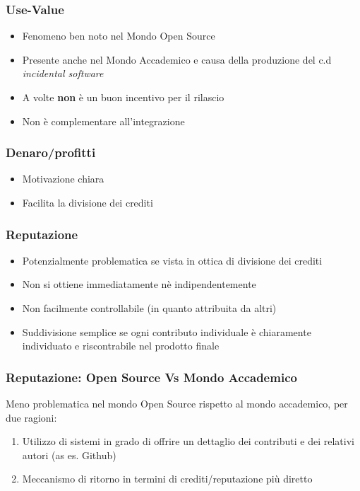\begin{frame}\frametitle{Use-Value}

\Large

\begin{itemize}[<+->]
\itemsep1pt\parskip0pt
\item
  Fenomeno ben noto nel Mondo Open Source
\item
  Presente anche nel Mondo Accademico e causa della produzione del c.d
  \emph{incidental software}
\item
  A volte \textbf{non} è un buon incentivo per il rilascio
\item
  Non è complementare all'integrazione
\end{itemize}

\end{frame}

\begin{frame}\frametitle{Denaro/profitti}

\Large

\begin{itemize}[<+->]
\itemsep1pt\parskip0pt
\item
  Motivazione chiara
\item
  Facilita la divisione dei crediti
\end{itemize}

\end{frame}

\begin{frame}\frametitle{Reputazione}

\Large

\begin{itemize}[<+->]
\itemsep1pt\parskip0pt
\item
  Potenzialmente problematica se vista in ottica di divisione dei
  crediti
\item
  Non si ottiene immediatamente nè indipendentemente
\item
  Non facilmente controllabile (in quanto attribuita da altri)
\item
  Suddivisione semplice se \alert{ogni} contributo individuale è
  \alert{chiaramente individuato} e riscontrabile nel prodotto finale
\end{itemize}

\end{frame}

\begin{frame}\frametitle{Reputazione:
\small{Open Source Vs Mondo Accademico}}

\Large{Meno problematica nel mondo Open Source rispetto al mondo accademico, per due ragioni:}

\begin{enumerate}[<+->]
\def\labelenumi{\arabic{enumi}.}
\itemsep1pt\parskip0pt
\item
  Utilizzo di sistemi in grado di offrire un dettaglio dei contributi e
  dei relativi autori (as es. Github)
\item
  Meccanismo di ritorno in termini di crediti/reputazione più diretto
\end{enumerate}

\end{frame}

